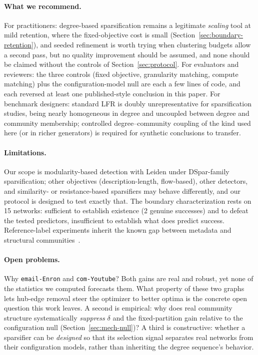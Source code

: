 \documentclass[10pt,journal,compsoc]{IEEEtran}
\begin{document}
\paragraph{What we recommend.}
For practitioners: degree-based sparsification remains a legitimate \emph{scaling} tool at mild retention, where the fixed-objective cost is small (Section~\ref{sec:boundary-retention}), and seeded refinement is worth trying when clustering budgets allow a second pass, but no quality improvement should be assumed, and none should be claimed without the controls of Section~\ref{sec:protocol}.
For evaluators and reviewers: the three controls (fixed objective, granularity matching, compute matching) plus the configuration-model null are each a few lines of code, and each reversed at least one published-style conclusion in this paper.
For benchmark designers: standard LFR is doubly unrepresentative for sparsification studies, being nearly homogeneous in degree and uncoupled between degree and community membership; controlled degree--community coupling of the kind used here (or in richer generators) is required for synthetic conclusions to transfer.

\paragraph{Limitations.}
Our scope is modularity-based detection with Leiden under DSpar-family sparsification; other objectives (description-length, flow-based), other detectors, and similarity- or resistance-based sparsifiers may behave differently, and our protocol is designed to test exactly that.
The boundary characterization rests on 15 networks: sufficient to establish existence (2 genuine successes) and to defeat the tested predictors, insufficient to establish what does predict success.
Reference-label experiments inherit the known gap between metadata and structural communities~\cite{peel2017ground, hric2014community}.

\paragraph{Open problems.}
Why \texttt{email-Enron} and \texttt{com-Youtube}?
Both gains are real and robust, yet none of the statistics we computed forecasts them. What property of these two graphs lets hub-edge removal steer the optimizer to better optima is the concrete open question this work leaves.
A second is empirical: why does real community structure systematically \emph{suppress} $\delta$ and the fixed-partition gain relative to the configuration null (Section~\ref{sec:mech-null})? A third is constructive: whether a sparsifier can be \emph{designed} so that its selection signal separates real networks from their configuration models, rather than inheriting the degree sequence's behavior.
\end{document}
